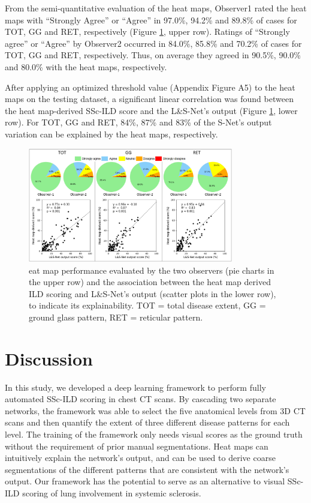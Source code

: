 From the semi-quantitative evaluation of the heat maps, Observer1 rated the heat maps with “Strongly Agree” or “Agree” in 97.0\%, 94.2\% and 89.8\% of cases for TOT, GG and RET, respectively (Figure \ref{fig8}, upper row). Ratings of “Strongly agree” or “Agree” by Observer2 occurred in 84.0\%, 85.8\% and 70.2\% of cases for TOT, GG and RET, respectively. Thus, on average they agreed in 90.5\%, 90.0\% and 80.0\% with the heat maps, respectively.

After applying an optimized threshold value (Appendix Figure A5) to the heat maps on the testing dataset, a significant linear correlation was found between the heat map-derived SSc-ILD score and the L\&S-Net’s output (Figure \ref{fig8}, lower row). For TOT, GG and RET, 84\%, 87\% and 83\% of the S-Net’s output variation can be explained by the heat maps, respectively.


\begin{figure}[tb]
    \centering
    \includegraphics[width=0.8\textwidth]{figure8.png}
    \caption{eat map performance evaluated by the two observers (pie charts in the upper row) and the association between the heat map derived ILD scoring and L\&S-Net’s output (scatter plots in the lower row), to indicate its explainability. TOT = total disease extent, GG = ground glass pattern, RET = reticular pattern.}
    \label{fig8}
\end{figure}

\section{Discussion}
In this study, we developed a deep learning framework to perform fully automated SSc-ILD scoring in chest CT scans. By cascading two separate networks, the framework was able to select the five anatomical levels from 3D CT scans and then quantify the extent of three different disease patterns for each level. The training of the framework only needs visual scores as the ground truth without the requirement of prior manual segmentations. Heat maps can intuitively explain the network’s output, and can be used to derive coarse segmentations of the different patterns that are consistent with the network’s output. Our framework has the potential to serve as an alternative to visual SSc-ILD scoring of lung involvement in systemic sclerosis.

